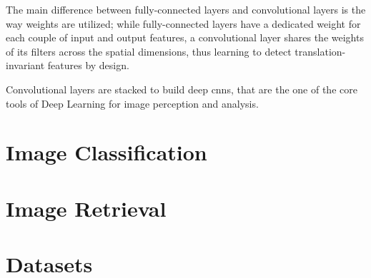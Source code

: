 The main difference between fully-connected layers and convolutional layers is the way weights are utilized;
while fully-connected layers have a dedicated weight for each couple of input and output features, a convolutional layer shares the weights of its filters across the spatial dimensions, thus learning to detect translation-invariant features by design.

Convolutional layers are stacked to build deep \glspl{cnn}, that are the one of the core tools of Deep Learning for image perception and analysis.





\section{Image Classification}
\label{sec:back:image-classification}




\section{Image Retrieval}
\label{sec:back:image-retrieval}


\section{Datasets}
\label{sec:back:datasets}
